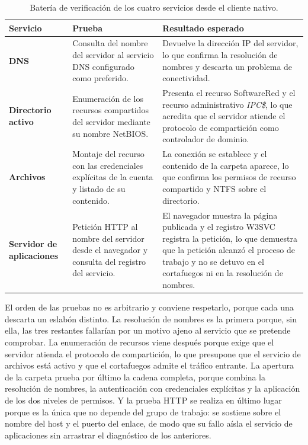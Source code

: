 \documentclass[12pt]{article}
\begin{document}
\begin{table}[H]
\centering
\small
\renewcommand{\arraystretch}{1.15}
\renewcommand{\tabularxcolumn}[1]{m{#1}}
\setlength{\emergencystretch}{1.5em}
\caption{Batería de verificación de los cuatro servicios desde el cliente nativo.}
\label{tab:bateriaVerificacion}
\begin{tabularx}{\textwidth}{>{\centering\arraybackslash}m{3.2cm} m{5.0cm} X}
\toprule
\textbf{Servicio} & \textbf{Prueba} & \textbf{Resultado esperado} \\
\midrule
\textbf{DNS} & Consulta del nombre del servidor al servicio DNS configurado como preferido. & Devuelve la dirección IP del servidor, lo que confirma la resolución de nombres y descarta un problema de conectividad. \\
\addlinespace
\textbf{Directorio activo} & Enumeración de los recursos compartidos del servidor mediante su nombre NetBIOS. & Presenta el recurso SoftwareRed y el recurso administrativo \textit{IPC\$}, lo que acredita que el servidor atiende el protocolo de compartición como controlador de dominio. \\
\addlinespace
\textbf{Archivos} & Montaje del recurso con las credenciales explícitas de la cuenta y listado de su contenido. & La conexión se establece y el contenido de la carpeta aparece, lo que confirma los permisos de recurso compartido y NTFS sobre el directorio. \\
\addlinespace
\textbf{Servidor de aplicaciones} & Petición HTTP al nombre del servidor desde el navegador y consulta del registro del servicio. & El navegador muestra la página publicada y el registro W3SVC registra la petición, lo que demuestra que la petición alcanzó el proceso de trabajo y no se detuvo en el cortafuegos ni en la resolución de nombres. \\
\bottomrule
\end{tabularx}
\end{table}

El orden de las pruebas no es arbitrario y conviene respetarlo, porque cada una descarta un eslabón distinto. La resolución de nombres es la primera porque, sin ella, las tres restantes fallarían por un motivo ajeno al servicio que se pretende comprobar. La enumeración de recursos viene después porque exige que el servidor atienda el protocolo de compartición, lo que presupone que el servicio de archivos está activo y que el cortafuegos admite el tráfico entrante. La apertura de la carpeta prueba por último la cadena completa, porque combina la resolución de nombres, la autenticación con credenciales explícitas y la aplicación de los dos niveles de permisos. Y la prueba HTTP se realiza en último lugar porque es la única que no depende del grupo de trabajo: se sostiene sobre el nombre del host y el puerto del enlace, de modo que su fallo aísla el servicio de aplicaciones sin arrastrar el diagnóstico de los anteriores.
\end{document}
